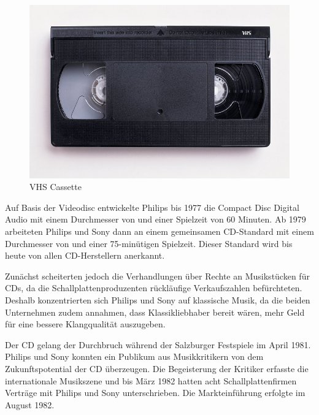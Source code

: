{\begin{figure}[h]
\begin{center}
            \hspace{0.025\textwidth}
            \begin{minipage}[t]{0.4\textwidth}
                \begin{center}
                    \includegraphics[height=0.1\textheight]{Bilder/Optische_Datentraeger_Die_Compact_Disc/Geschichte/vhs.png}
                    \caption[VHS cassette \newline \url{https://upload.wikimedia.org/wikipedia/commons/6/67/VHS-cassette.jpg} (zuletzt aufgerufen am 19.09.2015)]{VHS Cassette}
                    \label{fig:vhs}
                \end{center}
            \end{minipage}
        \end{center}
    \end{figure}
}{}

Auf Basis der Videodisc entwickelte Philips bis 1977 die Compact Disc Digital
Audio mit einem Durchmesser von  und einer Spielzeit von 60
Minuten. Ab 1979 arbeiteten Philips und Sony dann an einem gemeinsamen
CD-Standard mit einem Durchmesser von \nolbreaks{12 cm} und einer 75-minütigen
Spielzeit. Dieser Standard wird bis heute von allen CD-Herstellern anerkannt.
\cite{cds}

Zunächst scheiterten jedoch die Verhandlungen über Rechte an Musikstücken für
CDs, da die Schallplattenproduzenten rückläufige Verkaufszahlen befürchteten.
Deshalb konzentrierten sich Philips und Sony auf klassische Musik, da die beiden
Unternehmen zudem annahmen, dass Klassikliebhaber bereit wären, mehr Geld für
eine bessere Klangqualität auszugeben.

Der CD gelang der Durchbruch während der Salzburger Festspiele im April 1981.
Philips und Sony konnten ein Publikum aus Musikkritikern von dem
Zukunftspotential der CD überzeugen. Die Begeisterung der Kritiker erfasste die
internationale Musikszene und bis März 1982 hatten acht Schallplattenfirmen
Verträge mit Philips und Sony unterschrieben. Die Markteinführung erfolgte im
August 1982. \cite{cuz}

